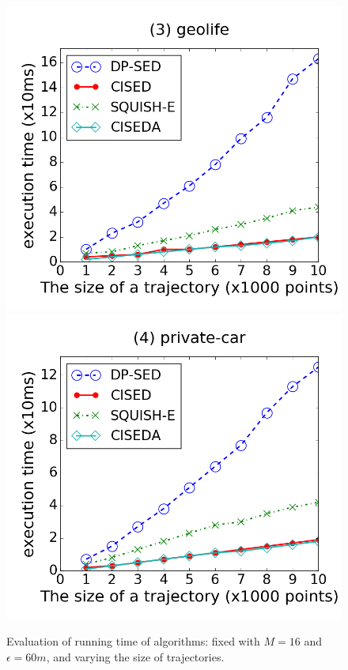 \begin{figure}[tb!]
\includegraphics[scale = 0.250]{figures/Exp-time-size-geolife.png}
\includegraphics[scale = 0.250]{figures/Exp-time-size-private.png}
\vspace{-2ex}
\caption{\small Evaluation of running time of \lsa algorithms: fixed with $M=16$ and $\epsilon=60m$, and varying the size of trajectories.}
\label{fig:time-size}
\vspace{-2ex}
\end{figure}





